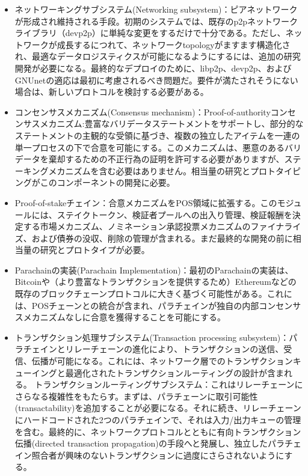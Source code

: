 \begin{itemize}
\tightlist
\item
  ネットワーキングサブシステム(Networking
  subsystem)：ピアネットワークが形成され維持される手段。初期のシステムでは、既存のp2pネットワークライブラリ（devp2p）に単純な変更をするだけで十分である。ただし、ネットワークが成長するにつれて、ネットワークtopologyがますます構造化され、最適なデータロジスティクスが可能になるようにするには、追加の研究開発が必要になる。最終的なデプロイのために、libp2p、devp2p、およびGNUnetの適応は最初に考慮されるべき問題だ。要件が満たされそうにない場合は、新しいプロトコルを検討する必要がある。
\item
  コンセンサスメカニズム(Consensus
  mechanism)：Proof-of-authorityコンセンサスメカニズム:豊富なバリデータステートメントをサポートし、部分的なステートメントの主観的な受領に基づき、複数の独立したアイテムを一連の単一プロセスの下で合意を可能にする。このメカニズムは、悪意のあるバリデータを棄却するための不正行為の証明を許可する必要がありますが、ステーキングメカニズムを含む必要はありません。相当量の研究とプロトタイピングがこのコンポーネントの開発に必要。
\item
  Proof-of-stakeチェイン：合意メカニズムをPOS領域に拡張する。このモジュールには、ステイクトークン、検証者プールへの出入り管理、検証報酬を決定する市場メカニズム、ノミネーション承認投票メカニズムのファイナライズ、および債券の没収、削除の管理が含まれる。まだ最終的な開発の前に相当量の研究とプロトタイプが必要。
\item
  Parachainの実装(Parachain
  Implementation)：最初のParachainの実装は、Bitcoinや（より豊富なトランザクションを提供するため）Ethereumなどの既存のブロックチェーンプロトコルに大きく基づく可能性がある。これには、POSチェーンとの統合が含まれ、パラチェインが独自の内部コンセンサスメカニズムなしに合意を獲得することを可能にする。
\item
  トランザクション処理サブシステム(Transaction processing
  subsystem)：パラチェインとリレーチェーンの進化により、トランザクションの送信、受信、伝播が可能になる。これには、ネットワーク層でのトランザクションキューイングと最適化されたトランザクションルーティングの設計が含まれる。
  トランザクションルーティングサブシステム：これはリレーチェーンにさらなる複雑性をもたらす。まずは、パラチェーンに取引可能性(transactability)を追加することが必要になる。それに続き、リレーチェーンにハードコードされた2つのパラチェインで、それは入力/出力キューの管理を含む。最終的に、ネットワークプロトコルとともに有向トランザクション伝播(directed
  transaction
  propagation)の手段へと発展し、独立したパラチェイン照合者が興味のないトランザクションに過度にさらされないようにする。

\end{itemize}
